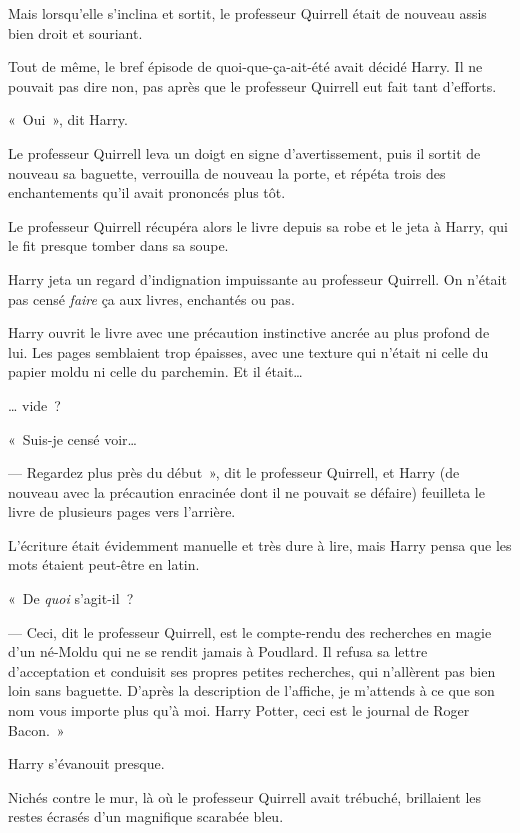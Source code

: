 Mais lorsqu'elle s'inclina et sortit, le professeur Quirrell était de nouveau assis bien droit et souriant.

Tout de même, le bref épisode de quoi-que-ça-ait-été avait décidé Harry.
Il ne pouvait pas dire non, pas après que le professeur Quirrell eut fait tant d'efforts.

«~Oui~», dit Harry.

Le professeur Quirrell leva un doigt en signe d'avertissement, puis il sortit de nouveau sa baguette, verrouilla de nouveau la porte, et répéta trois des enchantements qu'il avait prononcés plus tôt.

Le professeur Quirrell récupéra alors le livre depuis sa robe et le jeta à Harry, qui le fit presque tomber dans sa soupe.

Harry jeta un regard d'indignation impuissante au professeur Quirrell.
On n'était pas censé \emph{faire} ça aux livres, enchantés ou pas.

Harry ouvrit le livre avec une précaution instinctive ancrée au plus profond de lui.
Les pages semblaient trop épaisses, avec une texture qui n'était ni celle du papier moldu ni celle du parchemin.
Et il était…

… vide~?

«~Suis-je censé voir…

--- Regardez plus près du début~», dit le professeur Quirrell, et Harry (de nouveau avec la précaution enracinée dont il ne pouvait se défaire) feuilleta le livre de plusieurs pages vers l'arrière.

L'écriture était évidemment manuelle et très dure à lire, mais Harry pensa que les mots étaient peut-être en latin.

«~De \emph{quoi} s'agit-il~?

--- Ceci, dit le professeur Quirrell, est le compte-rendu des recherches en magie d'un né-Moldu qui ne se rendit jamais à Poudlard.
Il refusa sa lettre d'acceptation et conduisit ses propres petites recherches, qui n'allèrent pas bien loin sans baguette.
D'après la description de l'affiche, je m'attends à ce que son nom vous importe plus qu'à moi.
Harry Potter, ceci est le journal de Roger Bacon.~»

Harry s'évanouit presque.

Nichés contre le mur, là où le professeur Quirrell avait trébuché, brillaient les restes écrasés d'un magnifique scarabée bleu.
